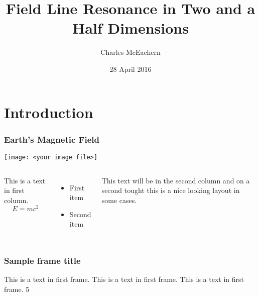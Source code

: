 \documentclass{beamer}
\title[FLR in 2.5D]{Field Line Resonance in Two and a Half Dimensions}
\author{Charles McEachern}
\date{28 April 2016}
\begin{document}

\frame{\titlepage}


\section{Introduction}


\begin{frame}
\frametitle{Earth's Magnetic Field}

\texttt{[image: <your image file>]}



\begin{columns}
 
This is a text in first column.
$$E=mc^2$$
\begin{itemize}
\item First item
\item Second item
\end{itemize}
 
This text will be in the second column
and on a second tought this is a nice looking
layout in some cases.
\end{columns}
\end{frame}


\begin{frame}
\frametitle{Sample frame title}
This is a text in first frame. This is a text in first frame. This is a text in first frame.
\SI{5}{\nT}
\end{frame}
\end{document}

